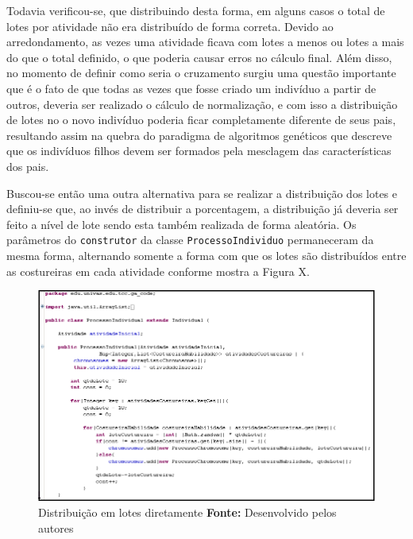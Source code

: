  \par Todavia verificou-se, que distribuindo desta forma, em alguns casos o total de lotes por atividade não era distribuído
 de forma correta. Devido ao arredondamento, as vezes uma atividade ficava com lotes a menos ou lotes a mais do que o total
 definido, o que poderia causar erros no cálculo final. Além disso, no momento de definir como seria o cruzamento 
 surgiu uma questão importante que é o fato de que todas as vezes que fosse criado um indivíduo a partir de outros, deveria
 ser realizado o cálculo de normalização, e com isso a distribuição de lotes no o novo indivíduo poderia ficar completamente
 diferente de seus pais, resultando assim na quebra do paradigma de algoritmos genéticos que descreve que os indivíduos filhos
 devem ser formados pela mesclagem das características dos pais. 


\par Buscou-se então uma outra alternativa para se realizar a distribuição dos lotes e definiu-se que, ao invés de distribuir
a porcentagem, a distribuição já deveria ser feito a nível de lote sendo esta também realizada de forma aleatória. Os parâmetros
do \texttt{construtor} da classe \texttt{ProcessoIndividuo} permaneceram da mesma forma, alternando somente a forma com que 
os lotes são distribuídos entre as costureiras em cada atividade conforme mostra a Figura X.

\begin{figure}[h!]
	\centerline{\includegraphics[scale=0.7]{./imagens/tentativa_2_individual.png}}
	\caption[Distribuição de lotes]
	{Distribuição em lotes diretamente \textbf{Fonte:} Desenvolvido pelos autores}
	\label{fig:exemplo1}
\end{figure}

